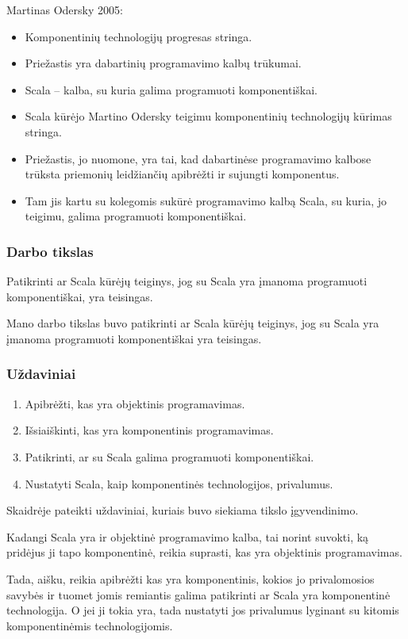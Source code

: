 \begin{frame}
  Martinas Odersky 2005:
  \begin{itemize}
    \item Komponentinių technologijų progresas stringa.
    \item Priežastis yra dabartinių programavimo kalbų trūkumai.
    \item Scala – kalba, su kuria galima programuoti komponentiškai.
  \end{itemize}
  \begin{handout}
    \begin{itemize}
      \item Scala kūrėjo Martino Odersky teigimu komponentinių
        technologijų kūrimas stringa.
      \item Priežastis, jo nuomone, yra tai, kad dabartinėse
        programavimo kalbose trūksta priemonių leidžiančių
        apibrėžti ir sujungti komponentus.
      \item Tam jis kartu su kolegomis sukūrė programavimo kalbą
        Scala, su kuria, jo teigimu, galima programuoti komponentiškai.
    \end{itemize}
  \end{handout}
\end{frame}

\begin{frame}
  \frametitle{Darbo tikslas}
  Patikrinti ar Scala kūrėjų teiginys, jog su Scala yra įmanoma
  programuoti komponentiškai, yra teisingas.
  \begin{handout}
    Mano darbo tikslas buvo patikrinti ar Scala kūrėjų teiginys, jog
    su Scala yra įmanoma programuoti komponentiškai yra teisingas.
  \end{handout}
\end{frame}

\begin{frame}
  \frametitle{Uždaviniai}
  \begin{enumerate}
    \item Apibrėžti, kas yra objektinis programavimas.
    \item Išsiaiškinti, kas yra komponentinis programavimas.
    \item Patikrinti, ar su Scala galima programuoti komponentiškai.
    \item Nustatyti Scala, kaip komponentinės technologijos, privalumus.
  \end{enumerate}
  \begin{handout}
    Skaidrėje pateikti uždaviniai, kuriais buvo siekiama tikslo
    įgyvendinimo.

    Kadangi Scala yra ir objektinė programavimo kalba, tai
    norint suvokti, ką pridėjus ji tapo komponentinė, reikia
    suprasti, kas yra objektinis programavimas.

    Tada, aišku, reikia apibrėžti kas yra komponentinis, kokios jo
    privalomosios savybės ir tuomet jomis remiantis galima patikrinti
    ar Scala yra komponentinė technologija. O jei ji tokia yra,
    tada nustatyti jos privalumus lyginant su kitomis komponentinėmis
    technologijomis.
  \end{handout}
\end{frame}

